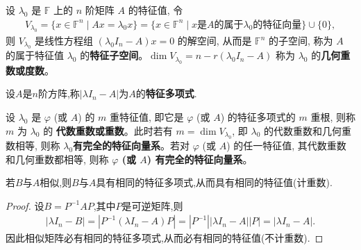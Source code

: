 \documentclass[lang=cn,newtx,10pt,scheme=chinese]{elegantbook}
\begin{document}
\begin{definition}[矩阵的特征子空间与几何重数]
设 $\lambda_0$ 是 $\mathbb{F}$ 上的 $n$ 阶矩阵 $A$ 的特征值, 令
\begin{align*}
V_{\lambda_0} = \{x \in \mathbb{F}^n \mid Ax = \lambda_0 x\} 
= \{x \in \mathbb{F}^n \mid x \text{是} A \text{的属于} \lambda_0 \text{的特征向量}\} \cup \{0\},
\end{align*}
则 $V_{\lambda_0}$ 是线性方程组 $(\lambda_0 I_n - A)x = 0$ 的解空间, 从而是 $\mathbb{F}^n$ 的子空间, 称为 $A$ 的属于特征值 $\lambda_0$ 的\textbf{特征子空间}。$\dim V_{\lambda_0} = n - r(\lambda_0 I_n - A)$ 称为 $\lambda_0$ 的\textbf{几何重数或度数}。
\end{definition}

\begin{definition}[特征多项式]
设$A$是$n$阶方阵,称$|\lambda I_n - A|$为$A$的\textbf{特征多项式}.
\end{definition}

\begin{definition}[代数重数与完全的特征向量系]
设 $\lambda_0$ 是 $\varphi$ (或 $A$) 的 $m$ 重特征值, 即它是 $\varphi$ (或 $A$) 的特征多项式的 $m$ 重根, 则称 $m$ 为 $\lambda_0$ 的 \textbf{代数重数或重数}。此时若有 $m = \dim V_{\lambda_0}$, 即 $\lambda_0$ 的代数重数和几何重数相等, 则称  \textbf{$\lambda_0$有完全的特征向量系}。若对 $\varphi$ (或 $A$) 的任一特征值, 其代数重数和几何重数都相等, 则称  \textbf{$\varphi$ (或 $A$) 有完全的特征向量系}。
\end{definition}

\begin{theorem}[相似矩阵有相同特征值]\label{theorem:相似矩阵有相同特征值}
若$B$与$A$相似,则$B$与$A$具有相同的特征多项式,从而具有相同的特征值(计重数).
\end{theorem}
\begin{proof}
设$B=P^{-1}AP$,其中$P$是可逆矩阵,则
\begin{align*}
|\lambda I_n - B| = |P^{-1}(\lambda I_n - A)P| = |P^{-1}||\lambda I_n - A||P| = |\lambda I_n - A|.
\end{align*}
因此相似矩阵必有相同的特征多项式,从而必有相同的特征值(不计重数).
\end{proof}
\end{document}
